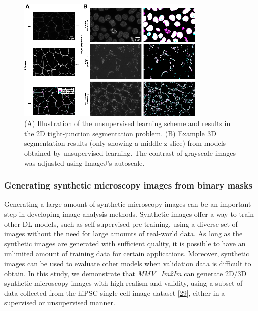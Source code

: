 \begin{figure}
\hypertarget{fig:unsupervised}{%
\centering
\includegraphics[width=0.8\textwidth,height=\textheight]{images/unsupervised_seg_justin.png}
\caption{(A) Illustration of the unsupervised learning scheme and results in the 2D tight-junction segmentation problem. (B) Example 3D segmentation results (only showing a middle z-slice) from models obtained by unsupervised learning. The contrast of grayscale images was adjusted using ImageJ's autoscale.}\label{fig:unsupervised}
}
\end{figure}

\hypertarget{generating-synthetic-microscopy-images-from-binary-masks}{%
\subsubsection{Generating synthetic microscopy images from binary masks}\label{generating-synthetic-microscopy-images-from-binary-masks}}

Generating a large amount of synthetic microscopy images can be an important step in developing image analysis methods. Synthetic images offer a way to train other DL models, such as self-supervised pre-training, using a diverse set of images without the need for large amounts of real-world data. As long as the synthetic images are generated with sufficient quality, it is possible to have an unlimited amount of training data for certain applications. Moreover, synthetic images can be used to evaluate other models when validation data is difficult to obtain. In this study, we demonstrate that \emph{MMV\_Im2Im} can generate 2D/3D synthetic microscopy images with high realism and validity, using a subset of data collected from the hiPSC single-cell image dataset {[}\protect\hyperlink{ref-5sGcmDuy}{29}{]}, either in a supervised or unsupervised manner.

